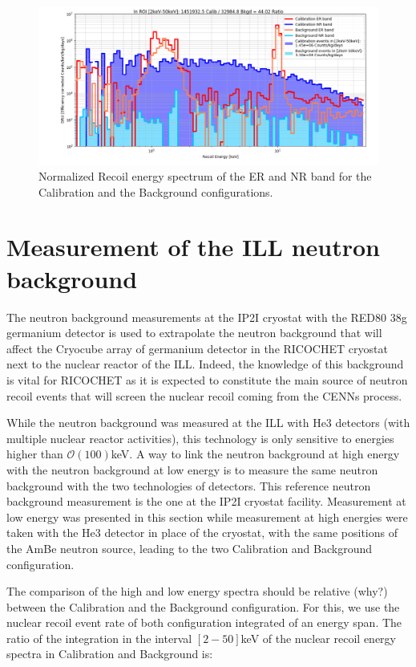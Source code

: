 \begin{figure}
\centering
\includegraphics[width=\linewidth,]{Figures/Neutron/background_measurements.png}
\caption{Normalized Recoil energy spectrum of the ER and NR band for the Calibration and the Background configurations.}
\label{fig:background-measurements}
\end{figure}


\section{Measurement of the ILL neutron background}

The neutron background measurements at the IP2I cryostat with the RED80 38g germanium detector is used to extrapolate the neutron background that will affect the Cryocube array of germanium detector in the RICOCHET cryostat next to the nuclear reactor of the ILL. Indeed, the knowledge of this background is vital for RICOCHET as it is expected to constitute the main source of neutron recoil events that will screen the nuclear recoil coming from the CENNs process.

While the neutron background was measured at the ILL with He3 detectors (with multiple nuclear reactor activities), this technology is only sensitive to energies higher than $\mathcal{O}(100)$keV. A way to link the neutron background at high energy with the neutron background at low energy is to measure the same neutron background with the two technologies of detectors.
This reference neutron background measurement is the one at the IP2I cryostat facility. Measurement at low energy was presented in this section while measurement at high energies were taken with the He3 detector in place of the cryostat, with the same positions of the AmBe neutron source, leading to the two Calibration and Background configuration.

The comparison of the high and low energy spectra should be relative (why?) between the Calibration and the Background configuration. For this, we use the nuclear recoil event rate of both configuration integrated of an energy span. The ratio of the integration in the interval $[2-50]$keV of the nuclear recoil energy spectra in Calibration and Background is:

